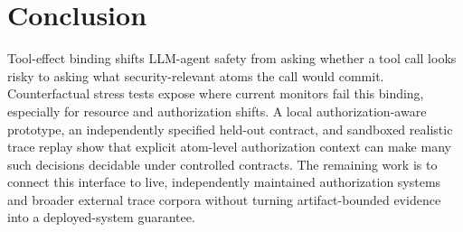 \section{Conclusion}

Tool-effect binding shifts LLM-agent safety from asking whether a tool call looks risky to asking what security-relevant atoms the call would commit. Counterfactual stress tests expose where current monitors fail this binding, especially for resource and authorization shifts. A local authorization-aware prototype, an independently specified held-out contract, and sandboxed realistic trace replay show that explicit atom-level authorization context can make many such decisions decidable under controlled contracts. The remaining work is to connect this interface to live, independently maintained authorization systems and broader external trace corpora without turning artifact-bounded evidence into a deployed-system guarantee.
